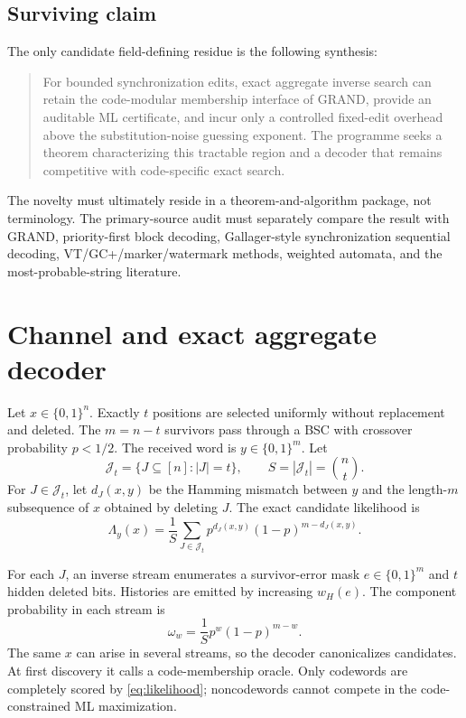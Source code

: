 \documentclass[11pt]{article}
\theoremstyle{definition}
\theoremstyle{remark}
\begin{document}
\subsection{Surviving claim}
The only candidate field-defining residue is the following synthesis:
\begin{quote}
For bounded synchronization edits, exact aggregate inverse search can retain the code-modular membership interface of GRAND, provide an auditable ML certificate, and incur only a controlled fixed-edit overhead above the substitution-noise guessing exponent.  The programme seeks a theorem characterizing this tractable region and a decoder that remains competitive with code-specific exact search.
\end{quote}

The novelty must ultimately reside in a theorem-and-algorithm package, not terminology.  The primary-source audit must separately compare the result with GRAND, priority-first block decoding, Gallager-style synchronization sequential decoding, VT/GC+/marker/watermark methods, weighted automata, and the most-probable-string literature.

\section{Channel and exact aggregate decoder}
Let $x\in\{0,1\}^n$.  Exactly $t$ positions are selected uniformly without replacement and deleted.  The $m=n-t$ survivors pass through a BSC with crossover probability $p<1/2$.  The received word is $y\in\{0,1\}^m$.  Let
\[
  \mathcal J_t=\{J\subseteq[n]:|J|=t\},\qquad S=|\mathcal J_t|=\binom nt.
\]
For $J\in\mathcal J_t$, let $d_J(x,y)$ be the Hamming mismatch between $y$ and the length-$m$ subsequence of $x$ obtained by deleting $J$.  The exact candidate likelihood is
\begin{equation}
  \Lambda_y(x)=\frac1S\sum_{J\in\mathcal J_t}p^{d_J(x,y)}(1-p)^{m-d_J(x,y)}.
  \label{eq:likelihood}
\end{equation}

For each $J$, an inverse stream enumerates a survivor-error mask $e\in\{0,1\}^m$ and $t$ hidden deleted bits.  Histories are emitted by increasing $w_H(e)$.  The component probability in each stream is
\begin{equation}
  \omega_w=\frac1S p^w(1-p)^{m-w}.
\end{equation}
The same $x$ can arise in several streams, so the decoder canonicalizes candidates.  At first discovery it calls a code-membership oracle.  Only codewords are completely scored by \eqref{eq:likelihood}; noncodewords cannot compete in the code-constrained ML maximization.
\end{document}
